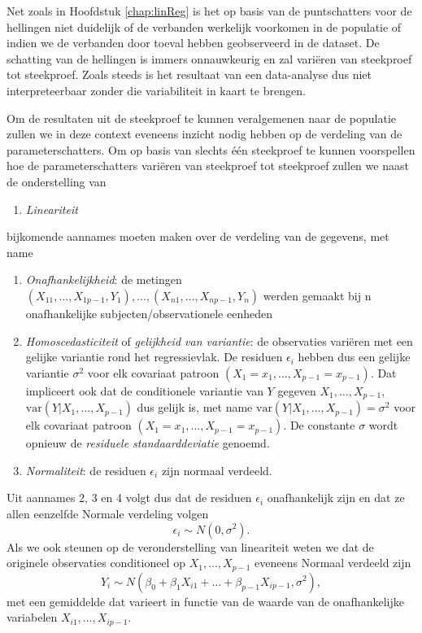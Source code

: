 \documentclass[12pt,dutch,coursenotes]{book}
\providecommand{\tightlist}{%
  \setlength{\itemsep}{0pt}\setlength{\parskip}{0pt}}
\theoremstyle{definition}
\theoremstyle{definition}
\theoremstyle{definition}
\theoremstyle{remark}
\begin{document}
Net zoals in Hoofdstuk \ref{chap:linReg} is het op basis van de
puntschatters voor de hellingen niet duidelijk of de verbanden werkelijk
voorkomen in de populatie of indien we de verbanden door toeval hebben
geobserveerd in de dataset. De schatting van de hellingen is immers
onnauwkeurig en zal variëren van steekproef tot steekproef. Zoals steeds
is het resultaat van een data-analyse dus niet interpreteerbaar zonder
die variabiliteit in kaart te brengen.

Om de resultaten uit de steekproef te kunnen veralgemenen naar de
populatie zullen we in deze context eveneens inzicht nodig hebben op de
verdeling van de parameterschatters. Om op basis van slechts één
steekproef te kunnen voorspellen hoe de parameterschatters variëren van
steekproef tot steekproef zullen we naast de onderstelling van

\begin{enumerate}
\def\labelenumi{\arabic{enumi}.}
\tightlist
\item
  \emph{Lineariteit}
\end{enumerate}

bijkomende aannames moeten maken over de verdeling van de gegevens, met
name

\begin{enumerate}
\def\labelenumi{\arabic{enumi}.}
\setcounter{enumi}{1}
\tightlist
\item
  \emph{Onafhankelijkheid}: de metingen
  \((X_{11},\dots, X_{1p-1}, Y_1), ..., (X_{n1},\ldots,X_{np-1},Y_n)\)
  werden gemaakt bij n onafhankelijke subjecten/observationele eenheden
\item
  \emph{Homoscedasticiteit} of \emph{gelijkheid van variantie}: de
  observaties variëren met een gelijke variantie rond het regressievlak.
  De residuen \(\epsilon_i\) hebben dus een gelijke variantie
  \(\sigma^2\) voor elk covariaat patroon
  \((X_1=x_1, ..., X_{p-1}=x_{p-1})\). Dat impliceert ook dat de
  conditionele variantie van \(Y\) gegeven \(X_1,\ldots,X_{p-1}\),
  \(\text{var}(Y\vert X_1,\ldots,X_{p-1})\) dus gelijk is, met name
  \(\text{var}(Y\vert X_1,\ldots,X_{p-1}) = \sigma^2\) voor elk
  covariaat patroon \((X_1=x_1, ..., X_{p-1}=x_{p-1})\). De constante
  \(\sigma\) wordt opnieuw de \emph{residuele standaarddeviatie}
  genoemd.
\item
  \emph{Normaliteit}: de residuen \(\epsilon_i\) zijn normaal verdeeld.
\end{enumerate}

Uit aannames 2, 3 en 4 volgt dus dat de residuen \(\epsilon_i\)
onafhankelijk zijn en dat ze allen eenzelfde Normale verdeling volgen
\[\epsilon_i \sim N(0,\sigma^2).\] Als we ook steunen op de
veronderstelling van lineariteit weten we dat de originele observaties
conditioneel op \(X_1,\ldots,X_{p-1}\) eveneens Normaal verdeeld zijn
\[Y_i\sim N(\beta_0+\beta_1 X_{i1}+\ldots+\beta_{p-1} X_{ip-1},\sigma^2),\]
met een gemiddelde dat varieert in functie van de waarde van de
onafhankelijke variabelen \(X_{i1},\ldots,X_{ip-1}\).
\end{document}
